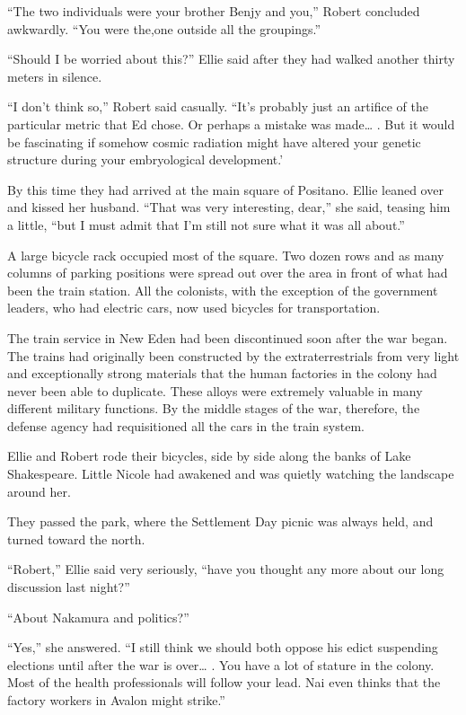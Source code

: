 \documentclass[]{article}
\begin{document}
{{“The two individuals were your brother Benjy and you,” Robert concluded awkwardly. “You were the,one outside all the groupings.”

“Should I be worried about this?” Ellie said after they had walked another thirty meters in silence.

“I don’t think so,” Robert said casually. “It’s probably just an artifice of the particular metric that Ed chose. Or perhaps a mistake was made… . But it would be fascinating if somehow cosmic radiation might have altered your genetic structure during your embryological development.’

By this time they had arrived at the main square of Positano. Ellie leaned over and kissed her husband. “That was very interesting, dear,” she said, teasing him a little, “but I must admit that I’m still not sure what it was all about.”

A large bicycle rack occupied most of the square. Two dozen rows and as many columns of parking positions were spread out over the area in front of what had been the train station. All the colonists, with the exception of the government leaders, who had electric cars, now used bicycles for transportation.

The train service in New Eden had been discontinued soon after the war began. The trains had originally been constructed by the extraterrestrials from very light and exceptionally strong materials that the human factories in the colony had never been able to duplicate. These alloys were extremely valuable in many different military functions. By the middle stages of the war, therefore, the defense agency had requisitioned all the cars in the train system.

Ellie and Robert rode their bicycles, side by side along the banks of Lake Shakespeare. Little Nicole had awakened and was quietly watching the landscape around her.

They passed the park, where the Settlement Day picnic was always held, and turned toward the north.

“Robert,” Ellie said very seriously, “have you thought any more about our long discussion last night?”

“About Nakamura and politics?”

“Yes,” she answered. “I still think we should both oppose his edict suspending elections until after the war is over… . You have a lot of stature in the colony. Most of the health professionals will follow your lead. Nai even thinks that the factory workers in Avalon might strike.”

}}
\end{document}
